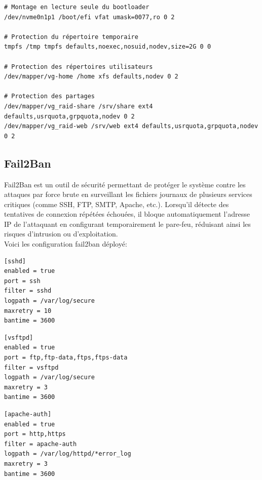 \documentclass[a4paper,12pt]{article}
\begin{document}
\begin{lstlisting}[caption={Configuration Système – /etc/fstab}]
# Montage en lecture seule du bootloader
/dev/nvme0n1p1 /boot/efi vfat umask=0077,ro 0 2

# Protection du répertoire temporaire
tmpfs /tmp tmpfs defaults,noexec,nosuid,nodev,size=2G 0 0

# Protection des répertoires utilisateurs
/dev/mapper/vg-home /home xfs defaults,nodev 0 2

# Protection des partages
/dev/mapper/vg_raid-share /srv/share ext4 defaults,usrquota,grpquota,nodev 0 2
/dev/mapper/vg_raid-web /srv/web ext4 defaults,usrquota,grpquota,nodev 0 2
\end{lstlisting}

\subsection{Fail2Ban}

Fail2Ban est un outil de sécurité permettant de protéger le système contre les attaques par force brute en surveillant les fichiers journaux de plusieurs services critiques (comme SSH, FTP, SMTP, Apache, etc.). Lorsqu'il détecte des tentatives de connexion répétées échouées, il bloque automatiquement l'adresse IP de l'attaquant en configurant temporairement le pare-feu, réduisant ainsi les risques d'intrusion ou d'exploitation.\\
Voici les configuration fail2ban déployé: 

\begin{lstlisting}[caption={Configuration Fail2Ban SSH – /etc/fail2ban/jail.d/sshd.local}]
[sshd]
enabled = true
port = ssh
filter = sshd
logpath = /var/log/secure
maxretry = 10
bantime = 3600
\end{lstlisting}

\begin{lstlisting}[caption={Configuration Fail2Ban FTP – /etc/fail2ban/jail.d/ftp.local}]
[vsftpd]
enabled = true
port = ftp,ftp-data,ftps,ftps-data
filter = vsftpd
logpath = /var/log/secure
maxretry = 3
bantime = 3600
\end{lstlisting}

\begin{lstlisting}[caption={Configuration Fail2Ban Apache – /etc/fail2ban/jail.d/apache.local}]
[apache-auth]
enabled = true
port = http,https
filter = apache-auth
logpath = /var/log/httpd/*error_log
maxretry = 3
bantime = 3600
\end{lstlisting}
\end{document}
